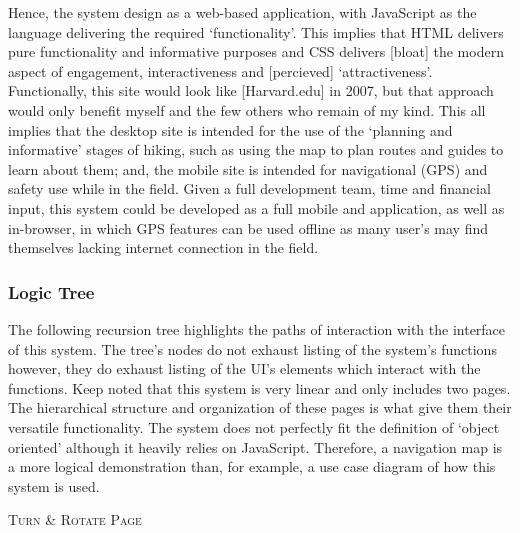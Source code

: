 \documentclass[11pt, english]{article}
\begin{document}
	Hence, the system design as a web-based application, with JavaScript as the language delivering the required `functionality'. This implies that HTML delivers pure functionality and informative purposes and CSS delivers [bloat] the modern aspect of engagement, interactiveness and [percieved] `attractiveness'. Functionally, this site would look like [Harvard.edu] in 2007, but that approach would only benefit myself and the few others who remain of my kind. This all implies that the desktop site is intended for the use of the `planning and informative' stages of hiking, such as using the map to plan routes and guides to learn about them; and, the mobile site is intended for navigational (GPS) and safety use while in the field. Given a full development team, time and financial input, this system could be developed as a full mobile and application, as well as in-browser, in which GPS features can be used offline as many user's may find themselves lacking internet connection in the field.

		\subsubsection{Logic Tree}

	The following recursion tree highlights the paths of interaction with the interface of this system. The tree's nodes do not exhaust listing of the system's functions however, they do exhaust listing of the UI's elements which interact with the functions. Keep noted that this system is very linear and only includes two pages. The hierarchical structure and organization of these pages is what give them their versatile functionality. The system does not perfectly fit the definition of `object oriented' although it heavily relies on JavaScript. Therefore, a navigation map is a more logical demonstration than, for example, a use case diagram of how this system is used.

	\vspace{\fill}

	\begin{center}
		\textsc{Turn \& Rotate Page}
	\end{center}
\end{document}
